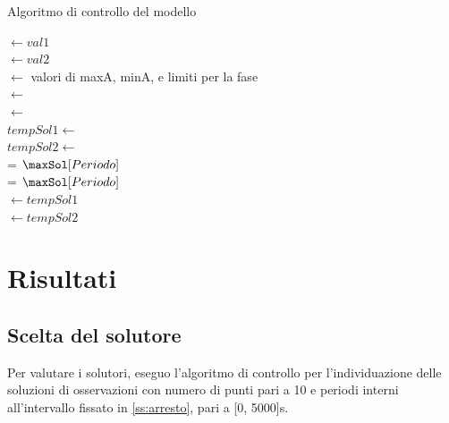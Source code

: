 \documentclass[a4paper,12pt]{report}
\begin{document}
\begin{algorithm}[H]
\caption{Algoritmo di controllo del modello}
\label{alg:controllo_modello}

\maxP $\leftarrow val1$ \\
\minP $\leftarrow val2$ \\
\conf $\leftarrow$ valori di maxA, minA, e limiti per la fase \\
 {
  \sol $\leftarrow$ \minInt{\data, \conf, \maxP, \minP} \\
  \maxSol $\leftarrow$ \maxInt{\data, \conf, \maxP, \minP} \\
  $tempSol1 \leftarrow$ \minInt{\data, \conf, \maxP, $\maxSol[Periodo]$} \\
  $tempSol2 \leftarrow$ \minInt{\data, \conf, $\maxSol[Periodo]$, \minP} \\
   {
    \minP =  $\maxSol[Periodo]$ \\
  } {
    \maxP = $\maxSol[Periodo]$ \\
  }
  \sol $\leftarrow tempSol1$ \\
  \sol $\leftarrow tempSol2$ \\

}

\end{algorithm}


\section{Risultati}
\label{s:risultati}

\subsection{Scelta del solutore}
\label{ss:scelta_solutore}
Per valutare i solutori, eseguo l'algoritmo di controllo per l'individuazione delle soluzioni di osservazioni con numero di punti pari a 10 e periodi interni all'intervallo fissato in \ref{ss:arresto}, pari a [0, 5000]s.
\end{document}

